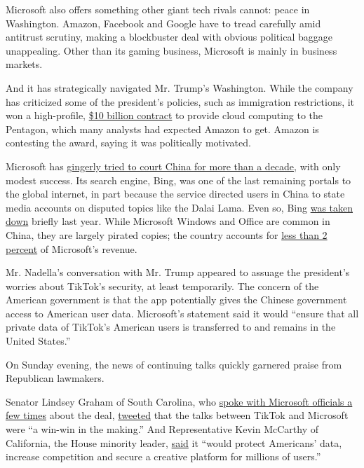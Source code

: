 Microsoft also offers something other giant tech rivals cannot: peace in
Washington. Amazon, Facebook and Google have to tread carefully amid
antitrust scrutiny, making a blockbuster deal with obvious political
baggage unappealing. Other than its gaming business, Microsoft is mainly
in business markets.

And it has strategically navigated Mr. Trump's Washington. While the
company has criticized some of the president's policies, such as
immigration restrictions, it won a high-profile,
\href{https://www.nytimes3xbfgragh.onion/2019/10/25/technology/dod-jedi-contract.html}{\$10
billion contract} to provide cloud computing to the Pentagon, which many
analysts had expected Amazon to get. Amazon is contesting the award,
saying it was politically motivated.

Microsoft has
\href{https://www.nytimes3xbfgragh.onion/2019/01/23/business/china-microsoft-bing.html}{gingerly
tried to court China for more than a decade}, with only modest success.
Its search engine, Bing, was one of the last remaining portals to the
global internet, in part because the service directed users in China to
state media accounts on disputed topics like the Dalai Lama. Even so,
Bing
\href{https://www.nytimes3xbfgragh.onion/2019/01/24/technology/microsoft-bing-china.html}{was
taken down} briefly last year. While Microsoft Windows and Office are
common in China, they are largely pirated copies; the country accounts
for
\href{https://www.nytimes3xbfgragh.onion/2020/02/26/technology/microsoft-coronavirus-earnings.html}{less
than 2 percent} of Microsoft's revenue.

Mr. Nadella's conversation with Mr. Trump appeared to assuage the
president's worries about TikTok's security, at least temporarily. The
concern of the American government is that the app potentially gives the
Chinese government access to American user data. Microsoft's statement
said it would ``ensure that all private data of TikTok's American users
is transferred to and remains in the United States.''

On Sunday evening, the news of continuing talks quickly garnered praise
from Republican lawmakers.

Senator Lindsey Graham of South Carolina, who
\href{https://www.nytimes3xbfgragh.onion/2020/08/02/business/economy/trump-tiktok-china-national-security.html}{spoke
with Microsoft officials a few times} about the deal,
\href{https://twitter.com/LindseyGrahamSC/status/1290083628261584896}{tweeted}
that the talks between TikTok and Microsoft were ``a win-win in the
making.'' And Representative Kevin McCarthy of California, the House
minority leader,
\href{https://twitter.com/GOPLeader/status/1290037004797804544}{said} it
``would protect Americans' data, increase competition and secure a
creative platform for millions of users.''

